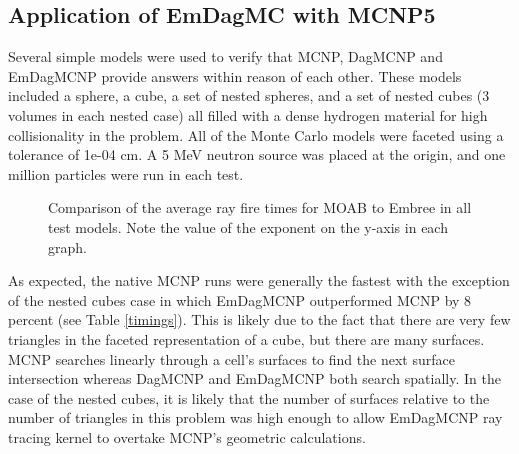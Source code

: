 \documentclass{anstrans}
\begin{document}
\subsection{Application of EmDagMC with MCNP5}

Several simple models were used to verify that MCNP, DagMCNP and EmDagMCNP provide answers within reason of each other. These models included a sphere, a cube, a set of nested spheres, and a set of nested cubes (3 volumes in each nested case) all filled with a dense hydrogen material for high collisionality in the problem. All of the Monte Carlo models were faceted using a tolerance of 1e-04 cm. A 5 MeV neutron source was placed at the origin, and one million particles were run in each test.


\begin{figure}[H]

  \begin{center}
    
    \caption{Comparison of the average ray fire times for MOAB to Embree in all test models. Note the value of the exponent on the y-axis in each graph. \label{rftiming}}
    
  \end{center}

\end{figure}

As expected, the native MCNP runs were generally the fastest with the exception of the nested cubes case in which EmDagMCNP outperformed MCNP by 8 percent (see Table \ref{timings}). This is likely due to the fact that there are very few triangles in the faceted representation of a cube, but there are many surfaces. MCNP searches linearly through a cell's surfaces to find the next surface intersection whereas DagMCNP and EmDagMCNP both search spatially. In the case of the nested cubes, it is likely that the number of surfaces relative to the number of triangles in this problem was high enough to allow EmDagMCNP ray tracing kernel to overtake MCNP's geometric calculations.
\end{document}
